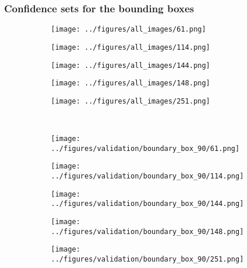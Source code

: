 \newpage
\subsubsection{Confidence sets for the bounding boxes}
\begin{figure}[h!]
	\begin{subfigure}{0.19\textwidth}
		\centering
		\texttt{[image: ../figures/all\_images/61.png]}
		\label{fig:1}
	\end{subfigure}
	\begin{subfigure}{0.19\textwidth}
		\centering
		\texttt{[image: ../figures/all\_images/114.png]}
		\label{fig:1}
	\end{subfigure}
	\begin{subfigure}{0.19\textwidth}
		\centering
		\texttt{[image: ../figures/all\_images/144.png]}
		\label{fig:1}
	\end{subfigure}
	\begin{subfigure}{0.19\textwidth}
		\centering
		\texttt{[image: ../figures/all\_images/148.png]}
		\label{fig:1}
	\end{subfigure}
	\begin{subfigure}{0.19\textwidth}
		\centering
		\texttt{[image: ../figures/all\_images/251.png]}
		\label{fig:1}
	\end{subfigure}
	\vspace{-0.35cm}
	\\
	\begin{subfigure}{0.19\textwidth}
		\centering
		\texttt{[image: ../figures/validation/boundary\_box\_90/61.png]}
		\label{fig:1}
	\end{subfigure}
	\begin{subfigure}{0.19\textwidth}
		\centering
		\texttt{[image: ../figures/validation/boundary\_box\_90/114.png]}
		\label{fig:1}
	\end{subfigure}
	\begin{subfigure}{0.19\textwidth}
		\centering
		\texttt{[image: ../figures/validation/boundary\_box\_90/144.png]}
		\label{fig:1}
	\end{subfigure}
	\begin{subfigure}{0.19\textwidth}
		\centering
		\texttt{[image: ../figures/validation/boundary\_box\_90/148.png]}
		\label{fig:1}
	\end{subfigure}
	\begin{subfigure}{0.19\textwidth}
		\centering
		\texttt{[image: ../figures/validation/boundary\_box\_90/251.png]}

\end{subfigure}
\end{figure}
